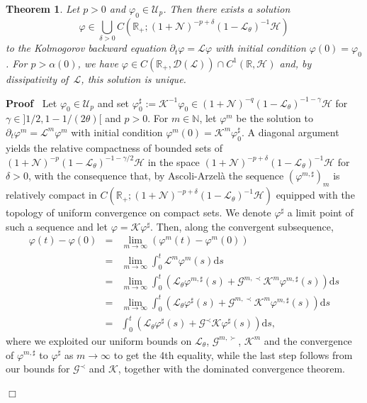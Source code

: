 \documentclass[10pt]{article}
\newcommand{\assign}{:=}
\newcommand{\mathd}{\mathrm{d}}
\newenvironment{proof}{\noindent\textbf{Proof\ }}{\hspace*{\fill}$\Box$\medskip}
\newtheorem{theorem}{Theorem}
\begin{document}
\begin{theorem}
  \label{thm:exist-kolmogorov}Let $p > 0$ and $\varphi_0 \in \mathcal{U}_p$.
  Then there exists a solution
  \[ \varphi \in \bigcup_{\delta > 0} C (\mathbb{R}_+ ; (1 +\mathcal{N})^{- p
     + \delta} (1 -\mathcal{L}_{\theta})^{- 1} \mathcal{H}) \]
  to the Kolmogorov backward equation $\partial_t \varphi =\mathcal{L}
  \varphi$ with initial condition $\varphi (0) = \varphi_0$. For $p > \alpha
  (0)$, we have $\varphi \in C (\mathbb{R}_+, \mathcal{D} (\mathcal{L})) \cap
  C^1 (\mathbb{R}, \mathcal{H})$ and, by dissipativity of~$\mathcal{L}$, this
  solution is unique.
\end{theorem}

\begin{proof}
  Let $\varphi_0 \in \mathcal{U}_p$ and set $\varphi_0^{\sharp} \assign
  \mathcal{K}^{- 1} \varphi_0 \in (1 +\mathcal{N})^{- q} (1
  -\mathcal{L}_{\theta})^{- 1 - \gamma} \mathcal{H}$ for $\gamma \in] 1 / 2, 1
  - 1 / (2 \theta) [$ and $p > 0$. For $m \in \mathbb{N}$, let $\varphi^m$ be
  the solution to $\partial_t \varphi^m =\mathcal{L}^m \varphi^m$ with initial
  condition $\varphi^m (0) =\mathcal{K}^m \varphi_0^{\sharp}$. A diagonal
  argument yields the relative compactness of bounded sets of $(1
  +\mathcal{N})^{- p} (1 -\mathcal{L}_{\theta})^{- 1 - \gamma / 2}
  \mathcal{H}$ in the space $(1 +\mathcal{N})^{- p + \delta} (1
  -\mathcal{L}_{\theta})^{- 1} \mathcal{H}$ for $\delta > 0$, with the
  consequence that, by Ascoli-Arzel{\`a} the sequence $(\varphi^{m,
  \sharp})_m$ is relatively compact in $C (\mathbb{R}_+ ; (1 +\mathcal{N})^{-
  p + \delta} (1 -\mathcal{L}_{\theta})^{- 1} \mathcal{H})$ equipped with the
  topology of uniform convergence on compact sets. We denote
  $\varphi^{\sharp}$ a limit point of such a sequence and let $\varphi
  =\mathcal{K} \varphi^{\sharp}$. Then, along the convergent subsequence,
  \begin{eqnarray*}
    \varphi (t) - \varphi (0) & = & \lim_{m \rightarrow \infty} (\varphi^m (t)
    - \varphi^m (0))\\
    & = & \lim_{m \rightarrow \infty} \int_0^t \mathcal{L}^m \varphi^m (s)
    \mathd s\\
    & = & \lim_{m \rightarrow \infty} \int_0^t (\mathcal{L}_{\theta}
    \varphi^{m, \sharp} (s) +\mathcal{G}^{m, \prec} \mathcal{K}^m \varphi^{m,
    \sharp} (s)) \mathd s\\
    & = & \lim_{m \rightarrow \infty} \int_0^t (\mathcal{L}_{\theta}
    \varphi^{\sharp} (s) +\mathcal{G}^{m, \prec} \mathcal{K}^m \varphi^{m,
    \sharp} (s)) \mathd s\\
    & = & \int_0^t (\mathcal{L}_{\theta} \varphi^{\sharp} (s)
    +\mathcal{G}^{\prec} \mathcal{K} \varphi^{\sharp} (s)) \mathd s,
  \end{eqnarray*}
  where we exploited our uniform bounds on $\mathcal{L}_{\theta}$,
  $\mathcal{G}^{m, \succ}$, $\mathcal{K}^m$ and the convergence of
  $\varphi^{m, \sharp}$ to $\varphi^{\sharp}$ as $m \rightarrow \infty$ to get
  the 4th equality, while the last step follows from our bounds for
  $\mathcal{G}^{\prec}$ and $\mathcal{K}$, together with the dominated
  convergence theorem.
  

\end{proof}
\end{document}
